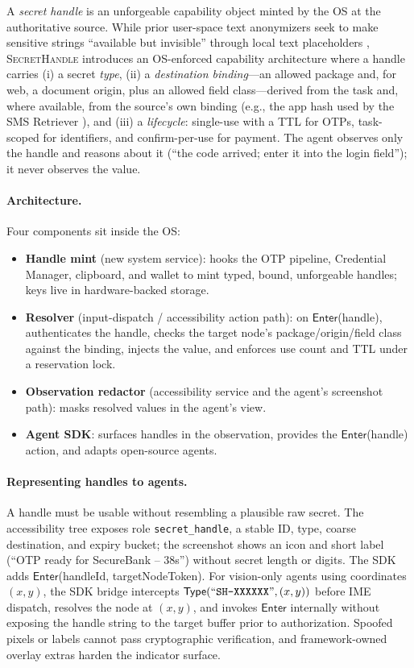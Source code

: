 \documentclass[sigconf,10pt]{acmart}
\newcommand{\SH}{\textsc{SecretHandle}}
\newcommand{\Enter}{\ensuremath{\mathsf{Enter}}}
\theoremstyle{acmplain}%
\begin{document}
A \emph{secret handle} is an unforgeable capability object minted by the OS at the authoritative source. While prior user-space text anonymizers seek to make sensitive strings ``available but invisible'' through local text placeholders \cite{zhao2026anonymization}, \SH{} introduces an OS-enforced capability architecture where a handle carries (i) a secret \emph{type}, (ii) a \emph{destination binding}---an allowed package and, for web, a document origin, plus an allowed field class---derived from the task and, where available, from the source's own binding (e.g., the app hash used by the SMS Retriever \cite{androidSmsRetriever}), and (iii) a \emph{lifecycle}: single-use with a TTL for OTPs, task-scoped for identifiers, and confirm-per-use for payment. The agent observes only the handle and reasons about it (``the code arrived; enter it into the login field''); it never observes the value.

\paragraph{Architecture.} Four components sit inside the OS:
\begin{itemize}[leftmargin=*]
  \item \textbf{Handle mint} (new system service): hooks the OTP pipeline, Credential Manager, clipboard, and wallet to mint typed, bound, unforgeable handles; keys live in hardware-backed storage.
  \item \textbf{Resolver} (input-dispatch / accessibility action path): on \Enter(handle), authenticates the handle, checks the target node's package/origin/field class against the binding, injects the value, and enforces use count and TTL under a reservation lock.
  \item \textbf{Observation redactor} (accessibility service and the agent's screenshot path): masks resolved values in the agent's view.
  \item \textbf{Agent SDK}: surfaces handles in the observation, provides the \Enter(handle) action, and adapts open-source agents.
\end{itemize}

\paragraph{Representing handles to agents.} A handle must be usable without resembling a plausible raw secret. The accessibility tree exposes role \texttt{secret\_handle}, a stable ID, type, coarse destination, and expiry bucket; the screenshot shows an icon and short label (``OTP ready for SecureBank -- 38s'') without secret length or digits. The SDK adds \Enter(handleId, targetNodeToken). For vision-only agents using coordinates $(x,y)$, the SDK bridge intercepts $\mathsf{Type}(\text{``\texttt{SH-XXXXXX}''}, (x,y))$ before IME dispatch, resolves the node at $(x,y)$, and invokes \Enter{} internally without exposing the handle string to the target buffer prior to authorization. Spoofed pixels or labels cannot pass cryptographic verification, and framework-owned overlay extras harden the indicator surface.
\end{document}
